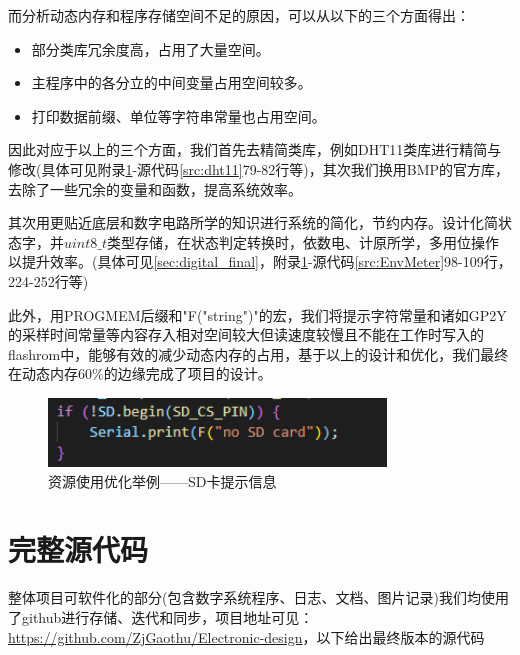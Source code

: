 \documentclass[a4paper, 11pt]{article} %
\begin{document}
\par{} 而分析动态内存和程序存储空间不足的原因，可以从以下的三个方面得出：
\begin{itemize}
\item 部分类库冗余度高，占用了大量空间。
\item 主程序中的各分立的中间变量占用空间较多。
\item 打印数据前缀、单位等字符串常量也占用空间。
\end{itemize}

\par{} 因此对应于以上的三个方面，我们首先去精简类库，例如DHT11类库进行精简与修改(具体可见附录\ref{sec:all_src}-源代码\ref{src:dht11}79-82行等)，其次我们换用BMP的官方库，去除了一些冗余的变量和函数，提高系统效率。

其次用更贴近底层和数字电路所学的知识进行系统的简化，节约内存。设计化简状态字，并$uint8\_t$类型存储，在状态判定转换时，依数电、计原所学，多用位操作以提升效率。(具体可见\ref{sec:digital_final}，附录\ref{sec:all_src}-源代码\ref{src:EnvMeter}98-109行，224-252行等)

此外，用PROGMEM后缀和"F("string")"的宏，我们将提示字符常量和诸如GP2Y的采样时间常量等内容存入相对空间较大但读速度较慢且不能在工作时写入的flashrom中，能够有效的减少动态内存的占用，基于以上的设计和优化，我们最终在动态内存60\%的边缘完成了项目的设计。

\begin{figure}[H]
  \centering
  \includegraphics[width = 0.8\textwidth]{F_marco.jpg}
  \caption{资源使用优化举例——SD卡提示信息}
\end{figure}

\newpage



\newpage
\appendix


\section{完整源代码}
\label{sec:all_src}
整体项目可软件化的部分(包含数字系统程序、日志、文档、图片记录)我们均使用了github进行存储、迭代和同步，项目地址可见：\href{https://github.com/ZjGaothu/Electronic-design}{https://github.com/ZjGaothu/Electronic-design}，以下给出最终版本的源代码
\end{document}
